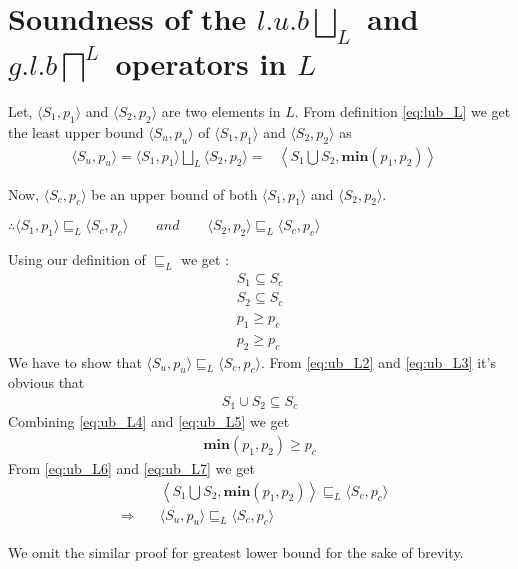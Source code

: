 \documentclass[final,3p, review, times]{util/elsarticle}
\begin{document}
\section{\\Soundness of the $l.u.b \displaystyle\bigsqcup_L$ and $g.l.b \displaystyle\bigsqcap^L$ operators in $L$}
\label{app:concrete_ub}

Let, $\langle S_1,p_1\rangle$ and $\langle S_2,p_2\rangle$ are two elements in $L$. From definition \ref{eq:lub_L} we get the least upper bound $\langle S_u,p_u\rangle$ of $\langle S_1,p_1\rangle$ and $\langle S_2,p_2\rangle$ as
\begin{align}
\langle S_u,p_u\rangle=\langle S_1,p_1\rangle\bigsqcup_L\langle S_2,p_2\rangle=&\left\langle S_1\bigcup S_2,\textbf{min}(p_1,p_2)\right\rangle\label{eq:ub_L1}&
\end{align}

Now, $\langle S_c,p_c\rangle$ be an upper bound of both $\langle S_1,p_1\rangle$ and $\langle S_2,p_2\rangle$.

$\therefore \langle S_1,p_1\rangle\sqsubseteq_L\langle S_c,p_c\rangle\qquad and\qquad \langle S_2,p_2\rangle\sqsubseteq_L \langle S_c,p_c\rangle$

Using our definition of $\sqsubseteq_L$ we get :
\begin{align}
&S_1\subseteq S_c&\label{eq:ub_L2}\\
&S_2\subseteq S_c&\label{eq:ub_L3}\\
&p_1\geq p_c&\label{eq:ub_L4}\\
&p_2\geq p_c&\label{eq:ub_L5}
\end{align}
We have to show that $\langle S_u,p_u\rangle\sqsubseteq_L \langle S_c,p_c\rangle$. From \ref{eq:ub_L2} and \ref{eq:ub_L3} it's obvious that
\begin{align}
&S_1\cup S_2\subseteq S_c&\label{eq:ub_L6}
\end{align}
Combining \ref{eq:ub_L4} and \ref{eq:ub_L5} we get
\begin{align}
&\textbf{min}(p_1,p_2)\geq p_c&\label{eq:ub_L7}
\end{align}
From \ref{eq:ub_L6} and \ref{eq:ub_L7} we get
\begin{align}
&\left\langle S_1\bigcup S_2, \textbf{min}(p_1,p_2)\right\rangle\sqsubseteq_L\langle S_c,p_c\rangle&\nonumber\\
\Rightarrow\quad&\langle S_u,p_u\rangle\sqsubseteq_L\langle S_c,p_c\rangle\nonumber
\end{align}

We omit the similar proof for greatest lower bound for the sake of brevity.
\end{document}
